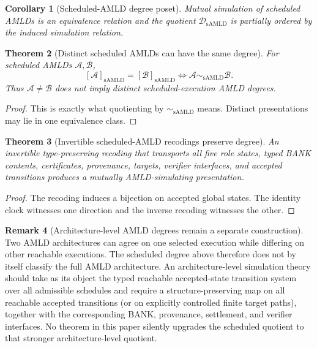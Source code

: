 \documentclass[11pt]{article}
\newtheorem{theorem}{Theorem}[section]
\newtheorem{corollary}[theorem]{Corollary}
\theoremstyle{definition}
\newtheorem{remark}[theorem]{Remark}
\newcommand{\Damld}{\mathcal{D}_{\mathrm{sAMLD}}}
\newcommand{\simamld}{\sim_{\mathrm{sAMLD}}}
\begin{document}
\begin{corollary}[Scheduled-AMLD degree poset]
Mutual simulation of scheduled AMLDs is an equivalence relation and the quotient $\Damld$ is partially ordered by the induced simulation relation.
\end{corollary}

\begin{theorem}[Distinct scheduled AMLDs can have the same degree]\label{thm:amld-equality}
For scheduled AMLDs $\mathcal A,\mathcal B$,
\[
[\mathcal A]_{\mathrm{sAMLD}}=[\mathcal B]_{\mathrm{sAMLD}}
\Longleftrightarrow
\mathcal A\simamld\mathcal B.
\]
Thus $\mathcal A\ne\mathcal B$ does not imply distinct scheduled-execution AMLD degrees.
\end{theorem}

\begin{proof}
This is exactly what quotienting by $\simamld$ means. Distinct presentations may lie in one equivalence class.
\end{proof}

\begin{theorem}[Invertible scheduled-AMLD recodings preserve degree]
An invertible type-preserving recoding that transports all five role states, typed BANK contents, certificates, provenance, targets, verifier interfaces, and accepted transitions produces a mutually AMLD-simulating presentation.
\end{theorem}

\begin{proof}
The recoding induces a bijection on accepted global states. The identity clock witnesses one direction and the inverse recoding witnesses the other.
\end{proof}

\begin{remark}[Architecture-level AMLD degrees remain a separate construction]
Two AMLD architectures can agree on one selected execution while differing on other reachable executions. The scheduled degree above therefore does not by itself classify the full AMLD architecture. An architecture-level simulation theory should take as its object the typed reachable accepted-state transition system over all admissible schedules and require a structure-preserving map on all reachable accepted transitions (or on explicitly controlled finite target paths), together with the corresponding BANK, provenance, settlement, and verifier interfaces. No theorem in this paper silently upgrades the scheduled quotient to that stronger architecture-level quotient.
\end{remark}
\end{document}
